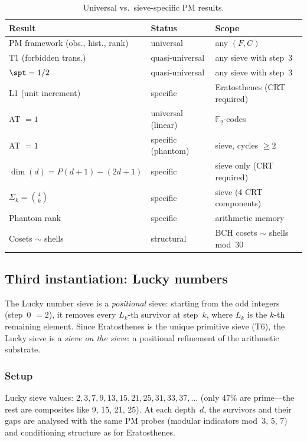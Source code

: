\documentclass[12pt,a4paper]{article}
\begin{document}
\begin{table}[htbp]
\centering
\caption{Universal vs.\ sieve-specific PM results.}
\label{tab:PM_classification}
\begin{tabular}{lll}
\toprule
\textbf{Result} & \textbf{Status} & \textbf{Scope} \\
\midrule
PM framework (obs., hist., rank) & universal & any $(F, C)$ \\
T1 (forbidden trans.) & quasi-universal & any sieve with step~3 \\
$\spt = 1/2$ & quasi-universal & any sieve with step~3 \\
L1 (unit increment) & specific & Eratosthenes (CRT required) \\
AT $= 1$ & universal (linear) & $\mathbb{F}_2$-codes \\
AT $= 1$ & specific (phantom) & sieve, cycles $\ge 2$ \\
$\dim(d) = P(d{+}1) - (2d{+}1)$ & specific & sieve only (CRT required) \\
$\Sigma_k = \binom{4}{k}$ & specific & sieve (4 CRT components) \\
Phantom rank & specific & arithmetic memory \\
Cosets $\sim$ shells & structural & BCH cosets $\sim$ shells mod~30 \\
\bottomrule
\end{tabular}
\end{table}


\subsection{Third instantiation: Lucky numbers}
\label{sec:PM_lucky}

The Lucky number sieve is a \emph{positional} sieve: starting from the odd
integers (step~0 $= 2$), it removes every $L_k$-th survivor at step~$k$,
where $L_k$ is the $k$-th remaining element.  Since Eratosthenes is the
unique primitive sieve (T6), the Lucky sieve is a \emph{sieve on the sieve}:
a positional refinement of the arithmetic substrate.

\subsubsection{Setup}

Lucky sieve values: $2, 3, 7, 9, 13, 15, 21, 25, 31, 33, 37, \ldots$
(only 47\% are prime---the rest are composites like 9, 15, 21, 25).
At each depth~$d$, the survivors and their gaps are analysed with the
same PM probes (modular indicators mod~3, 5, 7) and conditioning
structure as for Eratosthenes.
\end{document}
